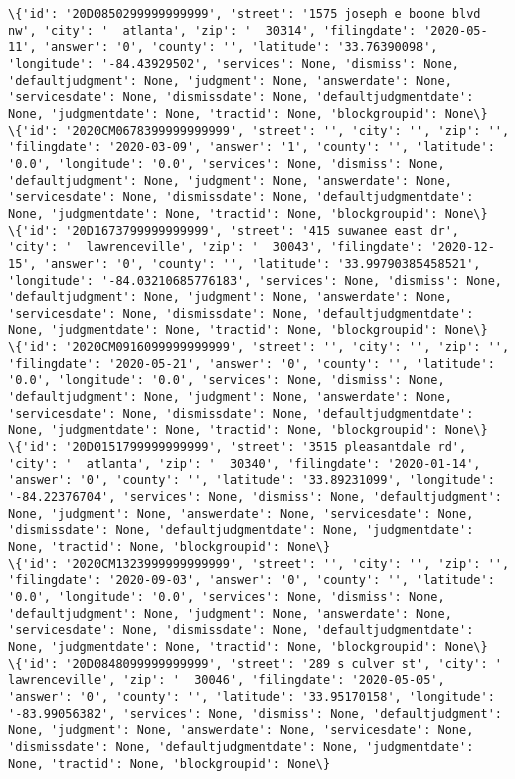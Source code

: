 \documentclass[11pt]{article}
\begin{document}
\begin{Verbatim}[commandchars=\\\{\}]
\{'id': '20D0850299999999999', 'street': '1575 joseph e boone blvd nw', 'city': '  atlanta', 'zip': '  30314', 'filingdate': '2020-05-11', 'answer': '0', 'county': '', 'latitude': '33.76390098', 'longitude': '-84.43929502', 'services': None, 'dismiss': None, 'defaultjudgment': None, 'judgment': None, 'answerdate': None, 'servicesdate': None, 'dismissdate': None, 'defaultjudgmentdate': None, 'judgmentdate': None, 'tractid': None, 'blockgroupid': None\}
\{'id': '2020CM0678399999999999', 'street': '', 'city': '', 'zip': '', 'filingdate': '2020-03-09', 'answer': '1', 'county': '', 'latitude': '0.0', 'longitude': '0.0', 'services': None, 'dismiss': None, 'defaultjudgment': None, 'judgment': None, 'answerdate': None, 'servicesdate': None, 'dismissdate': None, 'defaultjudgmentdate': None, 'judgmentdate': None, 'tractid': None, 'blockgroupid': None\}
\{'id': '20D1673799999999999', 'street': '415 suwanee east dr', 'city': '  lawrenceville', 'zip': '  30043', 'filingdate': '2020-12-15', 'answer': '0', 'county': '', 'latitude': '33.99790385458521', 'longitude': '-84.03210685776183', 'services': None, 'dismiss': None, 'defaultjudgment': None, 'judgment': None, 'answerdate': None, 'servicesdate': None, 'dismissdate': None, 'defaultjudgmentdate': None, 'judgmentdate': None, 'tractid': None, 'blockgroupid': None\}
\{'id': '2020CM0916099999999999', 'street': '', 'city': '', 'zip': '', 'filingdate': '2020-05-21', 'answer': '0', 'county': '', 'latitude': '0.0', 'longitude': '0.0', 'services': None, 'dismiss': None, 'defaultjudgment': None, 'judgment': None, 'answerdate': None, 'servicesdate': None, 'dismissdate': None, 'defaultjudgmentdate': None, 'judgmentdate': None, 'tractid': None, 'blockgroupid': None\}
\{'id': '20D0151799999999999', 'street': '3515 pleasantdale rd', 'city': '  atlanta', 'zip': '  30340', 'filingdate': '2020-01-14', 'answer': '0', 'county': '', 'latitude': '33.89231099', 'longitude': '-84.22376704', 'services': None, 'dismiss': None, 'defaultjudgment': None, 'judgment': None, 'answerdate': None, 'servicesdate': None, 'dismissdate': None, 'defaultjudgmentdate': None, 'judgmentdate': None, 'tractid': None, 'blockgroupid': None\}
\{'id': '2020CM1323999999999999', 'street': '', 'city': '', 'zip': '', 'filingdate': '2020-09-03', 'answer': '0', 'county': '', 'latitude': '0.0', 'longitude': '0.0', 'services': None, 'dismiss': None, 'defaultjudgment': None, 'judgment': None, 'answerdate': None, 'servicesdate': None, 'dismissdate': None, 'defaultjudgmentdate': None, 'judgmentdate': None, 'tractid': None, 'blockgroupid': None\}
\{'id': '20D0848099999999999', 'street': '289 s culver st', 'city': '  lawrenceville', 'zip': '  30046', 'filingdate': '2020-05-05', 'answer': '0', 'county': '', 'latitude': '33.95170158', 'longitude': '-83.99056382', 'services': None, 'dismiss': None, 'defaultjudgment': None, 'judgment': None, 'answerdate': None, 'servicesdate': None, 'dismissdate': None, 'defaultjudgmentdate': None, 'judgmentdate': None, 'tractid': None, 'blockgroupid': None\}

\end{Verbatim}
\end{document}
